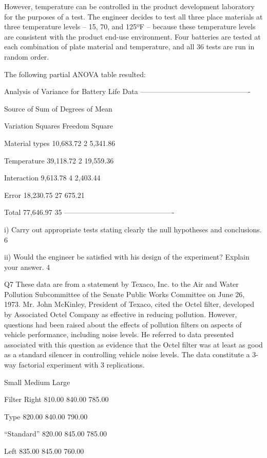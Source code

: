 However, temperature can be controlled in the product development laboratory for the purposes of a test. 
The engineer decides to test all three place materials at three temperature levels – 15, 70, and 125ºF – because these temperature levels are consistent with the product 
end-use environment. Four batteries are tested at each combination of plate material and temperature, and all 36 tests are run in random order.

The following partial ANOVA table resulted:

Analysis of Variance for Battery Life Data
----------------------------------------------

Source of Sum of Degrees of Mean

Variation Squares Freedom Square

Material types 10,683.72 2 5,341.86

Temperature 39,118.72 2 19,559.36

Interaction 9,613.78 4 2,403.44

Error 18,230.75 27 675.21

Total 77,646.97 35
----------------------------------------------

i) Carry out appropriate tests stating clearly the null hypotheses and conclusions. 6

ii) Would the engineer be satisfied with his design of the experiment? Explain your answer. 4


Q7 These data are from a statement by Texaco, Inc. to the Air and Water Pollution Subcommittee of the Senate Public Works Committee on June 26, 1973. Mr. John McKinley, President of Texaco, cited the Octel filter, developed by Associated Octel Company as effective in reducing pollution. However, questions had been raised about the effects of pollution filters on aspects of vehicle performance, including noise levels. He referred to data presented associated with this question as evidence that the Octel filter was at least as good as a standard silencer in controlling vehicle noise levels. The data constitute a 3-way factorial experiment with 3 replications.

Small Medium Large

Filter Right 810.00 840.00 785.00

Type 820.00 840.00 790.00

“Standard” 820.00 845.00 785.00

Left 835.00 845.00 760.00


